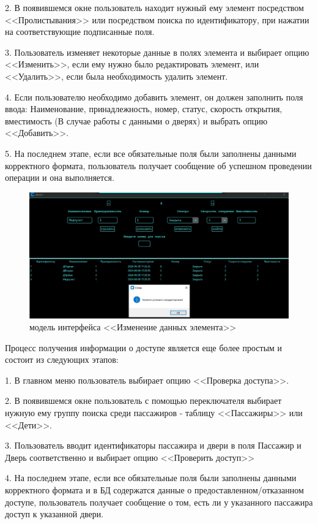 2. В появившемся окне пользователь находит нужный ему элемент посредством <<Пролистывания>> или посредством поиска по идентификатору, при нажатии на соответствующие подписанные поля.

3. Пользователь изменяет некоторые данные в полях элемента и выбирает опцию <<Изменить>>, если ему нужно было редактировать элемент, или <<Удалить>>, если была необходимость удалить элемент.

4. Если пользователю необходимо добавить элемент, он должен заполнить поля ввода: Наименование, принадлежность, номер, статус, скорость открытия, вместимость (В случае работы с данными о дверях) и выбрать опцию <<Добавить>>.

5. На последнем этапе, если все обязательные поля были заполнены данными корректного формата, пользователь получает сообщение об успешном проведении операции и она выполняется.

\begin{figure} [ht]
	\centering
	\includegraphics[width=1\linewidth]{images/Example1}
	\caption{модель интерфейса <<Изменение данных элемента>>}
	\label{fig:example1}
\end{figure}
Процесс получения информации о доступе является еще более простым и состоит из следующих этапов:

1. В главном меню пользователь выбирает опцию <<Проверка доступа>>.

2. В появившемся окне пользователь с помощью переключателя выбирает нужную ему группу поиска среди пассажиров - таблицу <<Пассажиры>> или <<Дети>>.

3. Пользователь вводит идентификаторы пассажира и двери в поля \textquotedbl Пассажир \textquotedbl и \textquotedbl Дверь \textquotedbl соответственно и выбирает опцию <<Проверить доступ>>

4. На последнем этапе, если все обязательные поля были заполнены данными корректного формата и в БД содержатся данные о предоставленном/отказанном доступе, пользователь получает сообщение о том, есть ли у указанного пассажира доступ к указанной двери.

